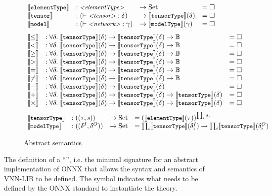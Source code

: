 \begin{figure}
	\begin{subfigure}{\textwidth}
	\begin{minipage}[t]{0.5\textwidth}
	\setlength{\arraycolsep}{2pt}
	\begin{equation*}
	\begin{array}{llll}
	\semElementType 
	&: \mgrammar{<elementType>}
	&\rightarrow \set
	&= \missing 
	\\
	\semTensor
	&: (\vdash \mgrammar{<tensor>} : \tensorTypeVar )
	& \rightarrow \semTensorType(\tensorTypeVar)
	&= \missing 
	\\
	\semModel
	&: (\vdash \mgrammar{<network>} : \modelTypeVar) 
	& \rightarrow \semModelType(\modelTypeVar) 
	&= \missing
	\end{array}
	\end{equation*}
	\begin{equation*}
	\begin{array}{llll}
	\compSem{\leq}
	\\
	\compSem{<}
	\\
	\compSem{\geq}
	\\
	\compSem{>}
	\\
	\compSem{=}
	\\
	\compSem{\neq}
	\\
	\opOneSem{-}
	\\
	\opTwoSem{+}
	\\
	\opTwoSem{\times}
	\end{array}
	\end{equation*}
	\begin{equation*}
	\begin{array}{llll}
	\semTensorType 
	&: ((\elementTypeVar, s))
	& \rightarrow \set
	&= (\semElementType(\elementTypeVar))^{\prod_i s_i}
	\\
	\semModelType 
	&: ((\tensorTypeVar^I, \tensorTypeVar^O))
	& \rightarrow \set 
	&= \prod_{i} \semTensorType(\tensorTypeVar^I_i)  \rightarrow
	\prod_{i} \semTensorType(\tensorTypeVar^O_i)
	\end{array}
	\end{equation*}
	\end{minipage}
	\caption{Abstract semantics}
	\label{fig:onnx-semantics}
	\end{subfigure}
	\caption{The definition of a ``\networkTheory{}'', i.e. the minimal signature for an abstract implementation of ONNX that allows the syntax and semantics of VNN-LIB to be defined. The \missing{} symbol indicates what needs to be defined by the ONNX standard to instantiate the theory.}
	\label{fig:onnx-signature}
\end{figure}


